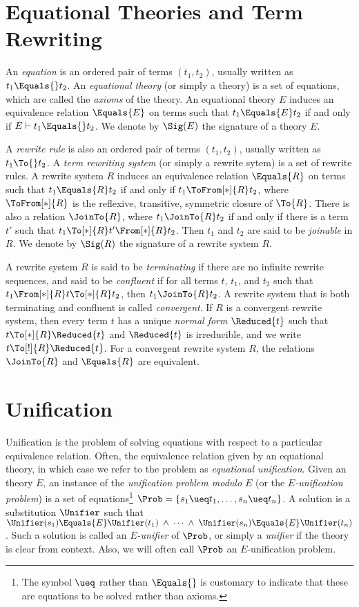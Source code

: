 \section{Equational Theories and Term Rewriting}\label{sec:eq-sys-term-rew}

An \emph{equation} is an ordered pair of terms $(t_1, t_2)$, usually written as
$t_1 \Equals{} t_2$. An \emph{equational theory} (or simply a theory) is a set
of equations, which are called the \emph{axioms} of the theory. An equational
theory $E$ induces an equivalence relation $\Equals{E}$ on terms such that $t_1
\Equals{E} t_2$ if and only if $E \vdash t_1 \Equals{} t_2$. We denote by
$\Sig(E)$ the signature of a theory $E$.

A \emph{rewrite rule} is also an ordered pair of terms $(t_1, t_2)$, usually
written as $t_1 \To{} t_2$. A \emph{term rewriting system} (or simply a rewrite
sytem) is a set of rewrite rules. A rewrite system $R$ induces an equivalence
relation $\Equals{R}$ on terms such that $t_1 \Equals{R} t_2$ if and only if
$t_1 \ToFrom[*]{R} t_2$, where $\ToFrom[*]{R}$ is the reflexive, transitive,
symmetric closure of $\To{R}$. There is also a relation $\JoinTo{R}$, where
$t_1 \JoinTo{R} t_2$ if and only if there is a term $t'$ such that $t_1
\To[*]{R} t' \From[*]{R} t_2$. Then $t_1$ and $t_2$ are said to be
\emph{joinable} in $R$. We denote by $\Sig(R)$ the signature of a rewrite
system $R$.

A rewrite system $R$ is said to be \emph{terminating} if there are no infinite
rewrite sequences, and said to be \emph{confluent} if for all terms $t$, $t_1$,
and $t_2$ such that $t_1 \From[*]{R} t \To[*]{R} t_2$, then $t_1 \JoinTo{R}
t_2$. A rewrite system that is both terminating and confluent is called
\emph{convergent}. If $R$ is a convergent rewrite system, then every term $t$
has a unique \emph{normal form} $\Reduced{t}$ such that $t \To[*]{R}
\Reduced{t}$ and $\Reduced{t}$ is irreducible, and we write $t \To[!]{R}
\Reduced{t}$. For a convergent rewrite system $R$, the relations $\JoinTo{R}$
and $\Equals{R}$ are equivalent.

\section{Unification}\label{sec:unification}

Unification is the problem of solving equations with respect to a particular
equivalence relation. Often, the equivalence relation given by an equational
theory, in which case we refer to the problem as \emph{equational unification}.
Given an theory $E$, an instance of the \emph{unification problem modulo $E$}
(or the \emph{$E$-unification problem}) is a set of equations\footnote{The
symbol $\ueq$ rather than $\Equals{}$ is customary to indicate that these are
equations to be solved rather than axioms.} $\Prob = \{ s_1 \ueq t_1, \dotsc,
s_n \ueq t_n \}$. A solution is a substitution $\Unifier$ such that $\Unifier(s_1)
\Equals{E} \Unifier(t_1) \; \wedge \; \dotsb \; \wedge \; \Unifier(s_n) \Equals{E}
\Unifier(t_n)$. Such a solution is called an \emph{$E$-unifier} of $\Prob$, or
simply a \emph{unifier} if the theory is clear from context. Also, we will often
call $\Prob$ an $E$-unification problem.

